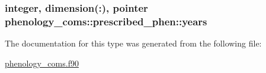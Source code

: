 \subsubsection[{\texorpdfstring{years}{years}}]{\setlength{\rightskip}{0pt plus 5cm}integer, dimension(\+:), pointer phenology\+\_\+coms\+::prescribed\+\_\+phen\+::years}\hypertarget{structphenology__coms_1_1prescribed__phen_ae40ae2762a61f5e09ce4162444b253b0}{}\label{structphenology__coms_1_1prescribed__phen_ae40ae2762a61f5e09ce4162444b253b0}


The documentation for this type was generated from the following file\+:\begin{DoxyCompactItemize}
\item 
\hyperlink{phenology__coms_8f90}{phenology\+\_\+coms.\+f90}\end{DoxyCompactItemize}

